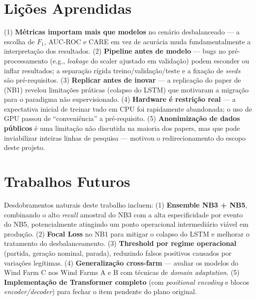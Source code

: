 \documentclass[12pt]{article}
\begin{document}
\section{Lições Aprendidas}

(1) \textbf{Métricas importam mais que modelos} no cenário desbalanceado --- a escolha de $F_1$, AUC-ROC e CARE em vez de acurácia muda fundamentalmente a interpretação dos resultados. (2) \textbf{Pipeline antes de modelo} --- bugs no pré-processamento (e.g., \textit{leakage} do scaler ajustado em validação) podem esconder ou inflar resultados; a separação rígida treino/validação/teste e a fixação de \textit{seeds} são pré-requisitos. (3) \textbf{Replicar antes de inovar} --- a replicação do paper de \citet{Qi2024_CNN_LSTM_Energies} (NB1) revelou limitações práticas (colapso do LSTM) que motivaram a migração para o paradigma não supervisionado. (4) \textbf{Hardware é restrição real} --- a expectativa inicial de treinar tudo em CPU foi rapidamente abandonada; o uso de GPU passou de ``conveniência'' a pré-requisito. (5) \textbf{Anonimização de dados públicos} é uma limitação não discutida na maioria dos papers, mas que pode inviabilizar inteiras linhas de pesquisa --- motivou o redirecionamento do escopo deste projeto.

\section{Trabalhos Futuros}\label{sec:trabalhos-futuros}

Desdobramentos naturais deste trabalho incluem: (1) \textbf{Ensemble NB3 + NB5}, combinando o alto \textit{recall} amostral do NB3 com a alta especificidade por evento do NB5, potencialmente atingindo um ponto operacional intermediário viável em produção. (2) \textbf{Focal Loss} no NB1 para mitigar o colapso do LSTM e melhorar o tratamento do desbalanceamento. (3) \textbf{Threshold por regime operacional} (partida, geração nominal, parada), reduzindo falsos positivos causados por variações legítimas. (4) \textbf{Generalização cross-farm} --- avaliar os modelos do Wind Farm C nos Wind Farms A e B com técnicas de \textit{domain adaptation}. (5) \textbf{Implementação de Transformer completo} (com \textit{positional encoding} e blocos \textit{encoder/decoder}) para fechar o item pendente do plano original.

\end{document}
